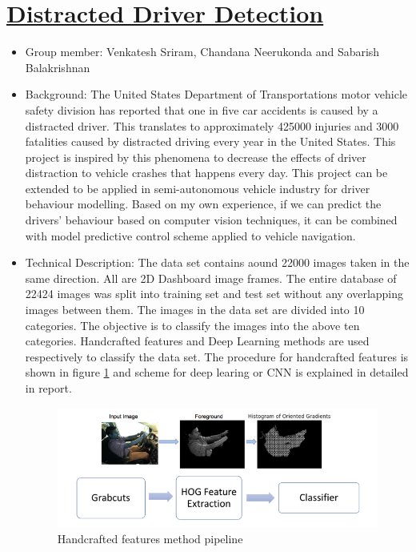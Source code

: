 \documentclass[letterpaper]{article}
\begin{document}
\section{\underline{Distracted Driver Detection}}
\begin{itemize}
	\item Group member: Venkatesh Sriram, Chandana Neerukonda and Sabarish Balakrishnan
	\item Background: The United States Department of Transportations motor vehicle safety division has reported that one in five car accidents is caused by a distracted driver. This translates to approximately 425000 injuries and 3000 fatalities caused by distracted driving every year in the United States. This project is inspired by this phenomena to decrease the effects of driver distraction to vehicle crashes that happens every day. This project can be extended to be applied in semi-autonomous vehicle industry for driver behaviour modelling. Based on my own experience, if we can predict the drivers' behaviour based on computer vision techniques, it can be combined with model predictive control scheme applied to vehicle navigation.
	\item Technical Description: The data set contains aound 22000 images taken in the same direction. All are 2D Dashboard image frames. The entire database of 22424 images was split into training set and test set without any overlapping images between them. The images in the data set are divided into 10 categories. The objective is to classify the images into the above ten categories. Handcrafted features and Deep Learning methods are used respectively to classify the data set. The procedure for handcrafted features is shown in figure \ref{hand} and scheme for deep learing or CNN is explained in detailed in report.
	\begin{figure}[H]
	\centering
	\includegraphics[scale=0.5]{hand.png}
	\caption{Handcrafted features method pipeline}
	\label{hand}
	\end{figure}
	

\end{itemize}
\end{document}
